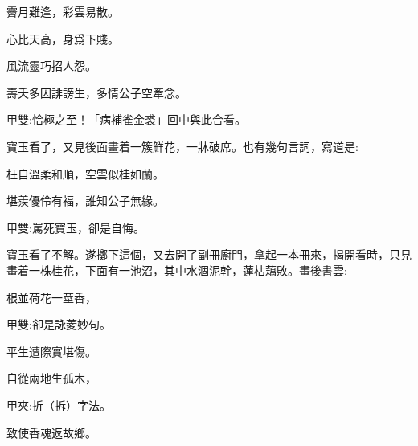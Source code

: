 \begin{poem}
    \begin{pl}霽月難逢，彩雲易散。\end{pl}

    \begin{pl}心比天高，身爲下賤。\end{pl}

    \begin{pl}風流靈巧招人怨。\end{pl}

    \begin{pl}壽夭多因誹謗生，多情公子空牽念。\end{pl}
    \begin{note}甲雙:恰極之至！「病補雀金裘」回中與此合看。\end{note}

\end{poem}


\begin{parag}
    寶玉看了，又見後面畫着一簇鮮花，一牀破席。也有幾句言詞，寫道是:
\end{parag}


\begin{poem}
    \begin{pl}枉自溫柔和順，空雲似桂如蘭。\end{pl}

    \begin{pl}堪羨優伶有福，誰知公子無緣。\end{pl}
    \begin{note}甲雙:罵死寶玉，卻是自悔。\end{note}

\end{poem}


\begin{parag}
    寶玉看了不解。遂擲下這個，又去開了副冊廚門，拿起一本冊來，揭開看時，只見畫着一株桂花，下面有一池沼，其中水涸泥幹，蓮枯藕敗。畫後書雲:
\end{parag}


\begin{poem}
    \begin{pl}根並荷花一莖香，\end{pl}
    \begin{note}甲雙:卻是詠菱妙句。\end{note}

    \begin{pl}平生遭際實堪傷。\end{pl}

    \begin{pl}自從兩地生孤木，\end{pl}
    \begin{note}甲夾:折（拆）字法。\end{note}

    \begin{pl}致使香魂返故鄉。\end{pl}
\end{poem}


